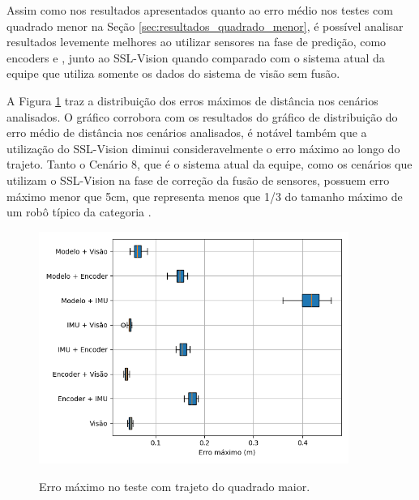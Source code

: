 \documentclass[acronym, symbols, table, deposito]{fei}
\begin{document}
		Assim como nos resultados apresentados quanto ao erro médio nos testes com quadrado menor na Seção \ref{sec:resultados_quadrado_menor}, é possível analisar resultados levemente melhores ao utilizar sensores na fase de predição, como encoders e , junto ao SSL-Vision quando comparado com o sistema atual da equipe que utiliza somente os dados do sistema de visão sem fusão.
	
		A Figura \ref{fig:erro_maximo_distancia_quad_maior} traz a distribuição dos erros máximos de distância nos cenários analisados. O gráfico corrobora com os resultados do gráfico de distribuição do erro médio de distância nos cenários analisados, é notável também que a utilização do SSL-Vision diminui consideravelmente o erro máximo ao longo do trajeto. Tanto o Cenário 8, que é o sistema atual da equipe, como os cenários que utilizam o SSL-Vision na fase de correção da fusão de sensores, possuem erro máximo menor que 5cm, que representa menos que 1/3 do tamanho máximo de um robô típico da categoria . %
		
		\begin{figure}[!htb]
			\centering
			\caption{Erro máximo no teste com trajeto do quadrado maior.}
			\includegraphics[width=0.9\textwidth]{../Dados/Graficos-Resultados/erro_maximo_distancia_quadrado_maior.png}
			\label{fig:erro_maximo_distancia_quad_maior}
		\end{figure}
	
\end{document}
